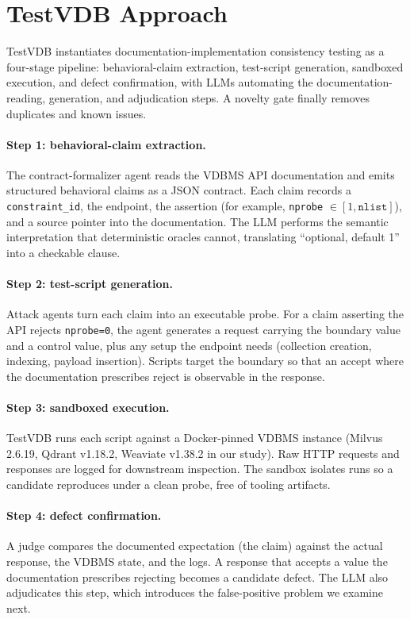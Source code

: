 \documentclass[sigconf]{acmart}
\begin{document}
\section{TestVDB Approach}
\label{sec:approach}

TestVDB instantiates documentation-implementation consistency testing as a four-stage pipeline: behavioral-claim extraction, test-script generation, sandboxed execution, and defect confirmation, with LLMs automating the documentation-reading, generation, and adjudication steps. A novelty gate finally removes duplicates and known issues.

\paragraph{Step 1: behavioral-claim extraction.}
The contract-formalizer agent reads the VDBMS API documentation and emits structured behavioral claims as a JSON contract. Each claim records a \texttt{constraint\_id}, the endpoint, the assertion (for example, \texttt{nprobe} $\in [1, \texttt{nlist}]$), and a source pointer into the documentation. The LLM performs the semantic interpretation that deterministic oracles cannot, translating ``optional, default 1'' into a checkable clause.

\paragraph{Step 2: test-script generation.}
Attack agents turn each claim into an executable probe. For a claim asserting the API rejects \texttt{nprobe=0}, the agent generates a request carrying the boundary value and a control value, plus any setup the endpoint needs (collection creation, indexing, payload insertion). Scripts target the boundary so that an accept where the documentation prescribes reject is observable in the response.

\paragraph{Step 3: sandboxed execution.}
TestVDB runs each script against a Docker-pinned VDBMS instance (Milvus 2.6.19, Qdrant v1.18.2, Weaviate v1.38.2 in our study). Raw HTTP requests and responses are logged for downstream inspection. The sandbox isolates runs so a candidate reproduces under a clean probe, free of tooling artifacts.

\paragraph{Step 4: defect confirmation.}
A judge compares the documented expectation (the claim) against the actual response, the VDBMS state, and the logs. A response that accepts a value the documentation prescribes rejecting becomes a candidate defect. The LLM also adjudicates this step, which introduces the false-positive problem we examine next.
\end{document}
